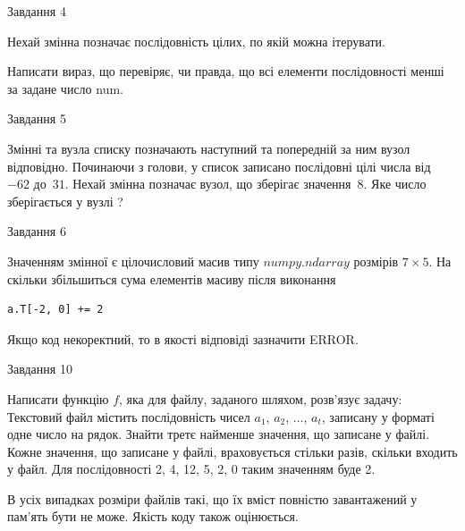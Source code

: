 \documentclass[12pt, ukrainian]{article}
\begin{document}
{               
{\begin{center}Завдання {4}\end{center}}
\vspace{-6mm}
Нехай змінна  позначає послідовність цілих, по якій можна ітерувати.

Написати вираз, що перевіряє, чи правда, що всі елементи послідовності менші за задане число num.\par

\vspace{10mm}
               
{\begin{center}Завдання {5}\end{center}}
\vspace{-6mm}
Змінні  та  вузла списку позначають наступний та попередній за ним вузол відповідно. Починаючи з голови, у список записано послідовні цілі числа від~$-62$ до~$31$. Нехай змінна  позначає вузол, що зберігає значення~$8$.
Яке число зберігається у вузлі  ?\par

               
{\begin{center}Завдання {6}\end{center}}
\vspace{-6mm}
Значенням змінної  є цілочисловий масив типу $numpy.ndarray$ розмірів $7{\times}5$. На скільки збільшиться сума елементів масиву  після виконання
\begin{verbatim}
a.T[-2, 0] += 2
\end{verbatim}


Якщо код некоректний, то в якості відповіді зазначити ERROR.\par

               
{\begin{center}Завдання {10}\end{center}}
\vspace{-6mm}

Написати функцію $f$, яка для файлу, заданого шляхом, розв’язує задачу:\\ Текстовий файл містить послідовність чисел $a_1$, $a_2$, $\ldots$, $a_t$, записану у форматі одне число на рядок. Знайти третє найменше значення, що записане у файлі. Кожне значення, що записане у файлі, враховується стільки разів, скільки входить у файл. Для послідовності 2, 4, 12, 5, 2, 0 таким значенням буде 2.

В усіх випадках розміри файлів такі, що їх вміст повністю завантажений у пам'ять бути не може. Якість коду також оцінюється.



}
\end{document}
